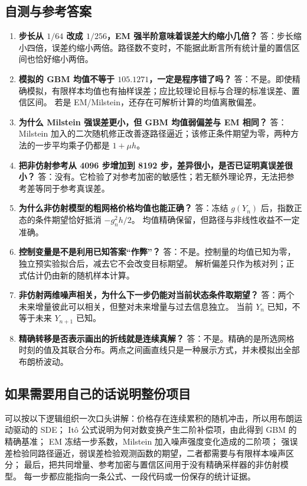 \subsection{自测与参考答案}
\begin{enumerate}
\item \textbf{步长从 $1/64$ 改成 $1/256$，EM 强半阶意味着误差大约缩小几倍？}
答：步长缩小四倍，误差约缩小两倍。路径数不变时，不能据此断言所有统计量的置信区间也恰好缩小两倍。
\item \textbf{模拟的 GBM 均值不等于 $105.1271$，一定是程序错了吗？}
答：不是。即使精确模拟，有限样本均值也有抽样误差；应比较理论目标与合理的标准误差、置信区间。
若是 EM/Milstein，还存在可解析计算的均值离散偏差。
\item \textbf{为什么 Milstein 强误差更小，但 GBM 均值弱偏差与 EM 相同？}
答：Milstein 加入的二次随机修正改善逐路径逼近；该修正条件期望为零，两种方法的一步平均乘子仍都是 $1+\mu h$。
\item \textbf{把非仿射参考从 4096 步增加到 8192 步，差异很小，是否已证明真误差很小？}
答：没有。它检验了对参考加密的敏感性；若无额外理论界，无法把参考差等同于参考真误差。
\item \textbf{为什么非仿射模型的粗网格价格均值也能正确？}
答：冻结 $g(Y_n)$ 后，指数正态的条件期望恰好抵消 $-g_n^2h/2$。
均值精确保留，但路径与非线性收益不一定准确。
\item \textbf{控制变量是不是利用已知答案“作弊”？}
答：不是。控制量的均值已知为零，独立预实验拟合后，减去它不会改变目标期望。
解析偏差只作为核对列；正式估计仍由新的随机样本计算。
\item \textbf{非仿射两维噪声相关，为什么下一步仍能对当前状态条件取期望？}
答：两个未来增量彼此可以相关，但整对未来增量与过去信息独立。
当前 $Y_n$ 已知，不等于未来 $Y_{n+1}$ 已知。
\item \textbf{精确转移是否表示画出的折线就是连续真解？}
答：不是。精确的是所选网格时刻的值及其联合分布。两点之间画直线只是一种展示方式，并未模拟出全部布朗桥波动。
\end{enumerate}

\subsection{如果需要用自己的话说明整份项目}
可以按以下逻辑组织一次口头讲解：价格存在连续累积的随机冲击，所以用布朗运动驱动的 SDE；
Itô 公式说明为何对数变换产生二阶补偿项，由此得到 GBM 的精确基准；
EM 冻结一步系数，Milstein 加入噪声强度变化造成的二阶项；
强误差检验同路径逼近，弱误差检验观测函数的期望，二者都需要与有限样本噪声区分；
最后，把共同增量、参考加密与置信区间用于没有精确采样器的非仿射模型。
每一步都应能指向一条公式、一段代码或一份保存的统计证据。

